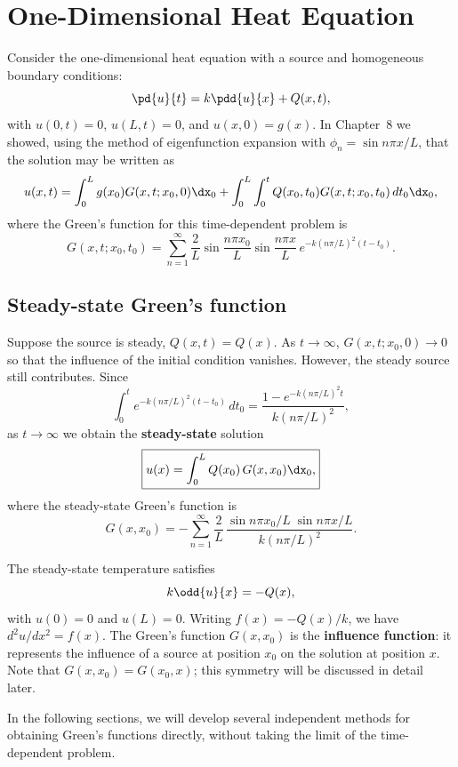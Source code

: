 \section{One-Dimensional Heat Equation}
\label{sec:greens-heat-1d}

Consider the one-dimensional heat equation with a source and homogeneous boundary conditions:
\begin{equation}
\label{eq:9.2.1}
\pd{u}{t} = k\pdd{u}{x} + Q(x,t),
\end{equation}
with $u(0,t) = 0$, $u(L,t) = 0$, and $u(x,0) = g(x)$.  In Chapter~8 we showed, using the method of eigenfunction expansion with $\phi_n = \sin n\pi x/L$, that the solution may be written as
\begin{equation}
\label{eq:9.2.2}
u(x,t) = \int_0^L g(x_0) G(x,t;x_0,0)\dx_0 + \int_0^L \int_0^t Q(x_0,t_0) G(x,t;x_0,t_0)\,dt_0\dx_0,
\end{equation}
where the Green's function for this time-dependent problem is
\begin{equation}
\label{eq:9.2.3}
G(x,t;x_0,t_0) = \sum_{n=1}^{\infty} \frac{2}{L}\sin\frac{n\pi x_0}{L}\sin\frac{n\pi x}{L}\,e^{-k(n\pi/L)^2(t-t_0)}.
\end{equation}

\subsection*{Steady-state Green's function}

Suppose the source is steady, $Q(x,t) = Q(x)$.  As $t\to\infty$, $G(x,t;x_0,0)\to 0$ so that the influence of the initial condition vanishes.  However, the steady source still contributes.  Since
\[
\int_0^t e^{-k(n\pi/L)^2(t-t_0)}\,dt_0 = \frac{1 - e^{-k(n\pi/L)^2 t}}{k(n\pi/L)^2},
\]
as $t\to\infty$ we obtain the \textbf{steady-state} solution
\begin{equation}
\label{eq:9.2.4}
\boxed{u(x) = \int_0^L Q(x_0)\,G(x,x_0)\dx_0,}
\end{equation}
where the steady-state Green's function is
\begin{equation}
\label{eq:9.2.5}
G(x,x_0) = -\sum_{n=1}^{\infty} \frac{2}{L}\,\frac{\sin n\pi x_0/L\;\sin n\pi x/L}{k(n\pi/L)^2}.
\end{equation}

The steady-state temperature satisfies
\begin{equation}
\label{eq:9.2.6}
k\odd{u}{x} = -Q(x),
\end{equation}
with $u(0) = 0$ and $u(L) = 0$.  Writing $f(x) = -Q(x)/k$, we have $d^2u/dx^2 = f(x)$.  The Green's function $G(x,x_0)$ is the \textbf{influence function}: it represents the influence of a source at position $x_0$ on the solution at position $x$.  Note that $G(x,x_0) = G(x_0,x)$; this symmetry will be discussed in detail later.

In the following sections, we will develop several independent methods for obtaining Green's functions directly, without taking the limit of the time-dependent problem.
